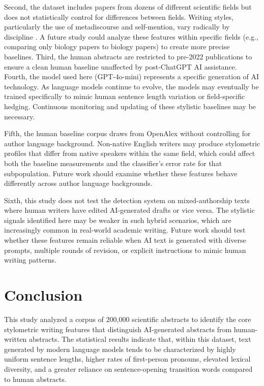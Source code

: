 \documentclass{article}
\begin{document}
Second, the dataset includes papers from dozens of different scientific fields but does not statistically control for differences between fields. Writing styles, particularly the use of metadiscourse and self-mention, vary radically by discipline \cite{ref2}. A future study could analyze these features within specific fields (e.g., comparing only biology papers to biology papers) to create more precise baselines. Third, the human abstracts are restricted to pre-2022 publications to ensure a clean human baseline unaffected by post-ChatGPT AI assistance. Fourth, the model used here (GPT-4o-mini) represents a specific generation of AI technology. As language models continue to evolve, the models may eventually be trained specifically to mimic human sentence length variation or field-specific hedging. Continuous monitoring and updating of these stylistic baselines may be necessary.

Fifth, the human baseline corpus draws from OpenAlex without controlling for author language background. Non-native English writers may produce stylometric profiles that differ from native speakers within the same field, which could affect both the baseline measurements and the classifier's error rate for that subpopulation. Future work should examine whether these features behave differently across author language backgrounds.

Sixth, this study does not test the detection system on mixed-authorship texts where human writers have edited AI-generated drafts or vice versa. The stylistic signals identified here may be weaker in such hybrid scenarios, which are increasingly common in real-world academic writing. Future work should test whether these features remain reliable when AI text is generated with diverse prompts, multiple rounds of revision, or explicit instructions to mimic human writing patterns.

\section{Conclusion}

This study analyzed a corpus of 200,000 scientific abstracts to identify the core stylometric writing features that distinguish AI-generated abstracts from human-written abstracts. The statistical results indicate that, within this dataset, text generated by modern language models tends to be characterized by highly uniform sentence lengths, higher rates of first-person pronouns, elevated lexical diversity, and a greater reliance on sentence-opening transition words compared to human abstracts.
\end{document}
